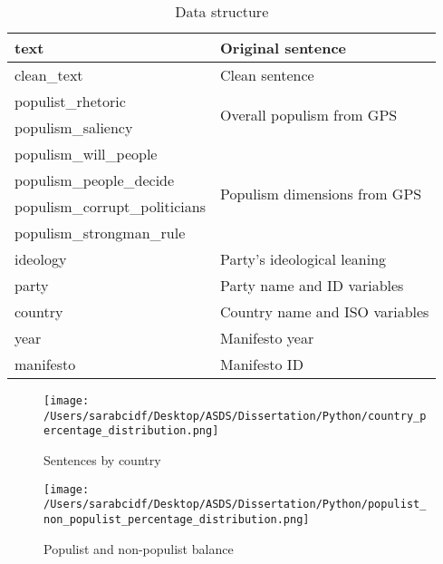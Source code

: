 \documentclass[12pt,letterpaper]{article}
\begin{document}
\begin{table}[h]
	\centering
	\caption{Data structure}
	\label{tab:yourtable}
\begin{tabular}{|l|l|}
	\hline
	text                           & Original sentence                             \\ \hline
	clean\_text                    & Clean sentence                                \\ \hline
	populist\_rhetoric             & \multirow{2}{*}{Overall populism from GPS}    \\ \cline{1-1}
	populism\_saliency             &                                               \\ \hline
	populism\_will\_people         & \multirow{4}{*}{Populism dimensions from GPS} \\ \cline{1-1}
	populism\_people\_decide       &                                               \\ \cline{1-1}
	populism\_corrupt\_politicians &                                               \\ \cline{1-1}
	populism\_strongman\_rule      &                                               \\ \hline
	ideology                       & Party's ideological leaning                   \\ \hline
	party                          & Party name and ID variables                   \\ \hline
	country                        & Country name and ISO variables                \\ \hline
	year                           & Manifesto year                                \\ \hline
	manifesto                      & Manifesto ID                                  \\ \hline
\end{tabular}
\end{table}

\begin{figure}[h]
	\centering
	\caption{Sentences by country}
	\label{fig:yourfigure}
	\texttt{[image: /Users/sarabcidf/Desktop/ASDS/Dissertation/Python/country\_percentage\_distribution.png]} 
\end{figure}

\begin{figure}[h]
	\centering
	\caption{Populist and non-populist balance}
	\label{fig:yourfigure}
	\texttt{[image: /Users/sarabcidf/Desktop/ASDS/Dissertation/Python/populist\_non\_populist\_percentage\_distribution.png]} 
\end{figure}
\end{document}
